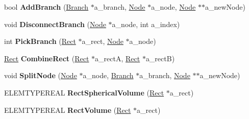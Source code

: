 \begin{DoxyCompactItemize}
\item 
\hypertarget{class_r_tree_af73c482c9a170955c874399a78b8091e}{bool {\bfseries \-Add\-Branch} (\hyperlink{struct_r_tree_1_1_branch}{\-Branch} $\ast$a\-\_\-branch, \hyperlink{struct_r_tree_1_1_node}{\-Node} $\ast$a\-\_\-node, \hyperlink{struct_r_tree_1_1_node}{\-Node} $\ast$$\ast$a\-\_\-new\-Node)}\label{class_r_tree_af73c482c9a170955c874399a78b8091e}

\item 
\hypertarget{class_r_tree_adcdcac926b2de35cc1f4f07e02b70bf6}{void {\bfseries \-Disconnect\-Branch} (\hyperlink{struct_r_tree_1_1_node}{\-Node} $\ast$a\-\_\-node, int a\-\_\-index)}\label{class_r_tree_adcdcac926b2de35cc1f4f07e02b70bf6}

\item 
\hypertarget{class_r_tree_a7c70c0761eb2c0e77db4cf846603d624}{int {\bfseries \-Pick\-Branch} (\hyperlink{struct_r_tree_1_1_rect}{\-Rect} $\ast$a\-\_\-rect, \hyperlink{struct_r_tree_1_1_node}{\-Node} $\ast$a\-\_\-node)}\label{class_r_tree_a7c70c0761eb2c0e77db4cf846603d624}

\item 
\hypertarget{class_r_tree_a90c2c0887fc456d2e9c7953e657958a7}{\hyperlink{struct_r_tree_1_1_rect}{\-Rect} {\bfseries \-Combine\-Rect} (\hyperlink{struct_r_tree_1_1_rect}{\-Rect} $\ast$a\-\_\-rect\-A, \hyperlink{struct_r_tree_1_1_rect}{\-Rect} $\ast$a\-\_\-rect\-B)}\label{class_r_tree_a90c2c0887fc456d2e9c7953e657958a7}

\item 
\hypertarget{class_r_tree_a38e60b3f2e970394492c8c6955375bec}{void {\bfseries \-Split\-Node} (\hyperlink{struct_r_tree_1_1_node}{\-Node} $\ast$a\-\_\-node, \hyperlink{struct_r_tree_1_1_branch}{\-Branch} $\ast$a\-\_\-branch, \hyperlink{struct_r_tree_1_1_node}{\-Node} $\ast$$\ast$a\-\_\-new\-Node)}\label{class_r_tree_a38e60b3f2e970394492c8c6955375bec}

\item 
\hypertarget{class_r_tree_a7958e17fc046e5d648d8e23ffc82e849}{\-E\-L\-E\-M\-T\-Y\-P\-E\-R\-E\-A\-L {\bfseries \-Rect\-Spherical\-Volume} (\hyperlink{struct_r_tree_1_1_rect}{\-Rect} $\ast$a\-\_\-rect)}\label{class_r_tree_a7958e17fc046e5d648d8e23ffc82e849}

\item 
\hypertarget{class_r_tree_af9f63fef551a4c3a42cd915618a9917a}{\-E\-L\-E\-M\-T\-Y\-P\-E\-R\-E\-A\-L {\bfseries \-Rect\-Volume} (\hyperlink{struct_r_tree_1_1_rect}{\-Rect} $\ast$a\-\_\-rect)}\label{class_r_tree_af9f63fef551a4c3a42cd915618a9917a}


\end{DoxyCompactItemize}
